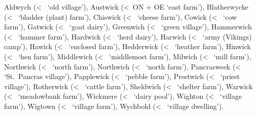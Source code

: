 \documentclass[12pt,letterpaper,oneside,article,draft]{memoir}
\begin{document}
\begin{Lemma}
\begin{Definitions}
\end{Definitions}
\begin{Examples}
	Aldwych (<~ ‘old village’),
	Austwick (<~ON  + OE  ‘east farm’),
	Blatherwycke (<~ ‘bladder (plant) farm’),
	Chiswick (<~ ‘cheese farm’),
	Cowick (<~ ‘cow farm’),
	Gatwick (<~ ‘goat dairy’),
	Greenwich (<~ ‘green village’),
	Hammerwich (<~ ‘hammer farm’),
	Hardwick (<~ ‘herd dairy’),
	Harwich (<~ ‘army (Vikings) camp’),
	Hawick (<~ ‘enclosed farm’),
	Hedderwick (<~ ‘heather farm’),
	Hinwick (<~ ‘hen farm’),
	Middlewich (<~ ‘middlemost farm’),
	Milwich (<~ ‘mill farm’),
	Northwick (<~ ‘north farm’),
	Northwich (<~ ‘north farm’),
	Pancrasweek (<~ ‘St.\ Pancras village’),
	Papplewick (<~ ‘pebble farm’),
	Prestwich (<~ ‘priest village’),
	Rotherwick (<~ ‘cattle farm’),
	Sheldwich (<~ ‘shelter farm’),
	Warwick (<~ ‘meadowbank farm’),
	Wickmere (<~ ‘dairy pool’),
	Wighton (<~ ‘village farm’),
	Wigtown (<~ ‘village farm’),
	Wychbold (<~ ‘village dwelling’).
\end{Examples}
\end{Lemma}
\end{document}
